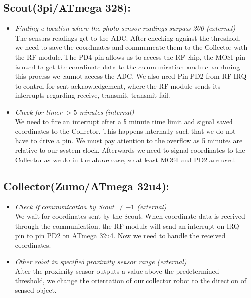 \documentclass[12pt]{article}
\begin{document}
\subsection*{Scout(3pi/ATmega 328):}
\begin{itemize}
\item \textit{Finding a location where the photo sensor readings surpass 200 (external)}\\
The sensors readings get to the ADC. After checking against the threshold, we need to save the coordinates and communicate them to the Collector with the RF module. The PD4 pin allows us to access the RF chip, the MOSI pin is used to get the coordinate data to the communication module, so during this process we cannot access the ADC. We also need Pin PD2 from RF IRQ to control for sent acknowledgement, where the RF module sends its interrupts regarding receive, transmit, transmit fail.
\item \textit{Check for timer $> 5$ minutes (internal)}\\
We need to fire an interrupt after a 5 minute time limit and signal saved coordinates to the Collector. This happens internally such that we do not have to drive a pin. We must pay attention to the overflow as 5 minutes are relative to our system clock. Afterwards we need to signal coordinates to the Collector as we do in the above case, so at least MOSI and PD2 are used.

\end{itemize}

\subsection*{Collector(Zumo/ATmega 32u4):}
\begin{itemize}
\item \textit{Check if communication by Scout $\neq -1$ (external)}\\
We wait for coordinates sent by the Scout. When coordinate data is received through the communication, the RF module will send an interrupt on IRQ pin to pin PD2 on ATmega 32u4. Now we need to handle the received coordinates.
\item \textit{Other robot in specified proximity sensor range (external)}\\
After the proximity sensor outputs a value above the predetermined threshold, we change the orientation of our collector robot to the direction of sensed object. 
\end{itemize} 
\end{document}

